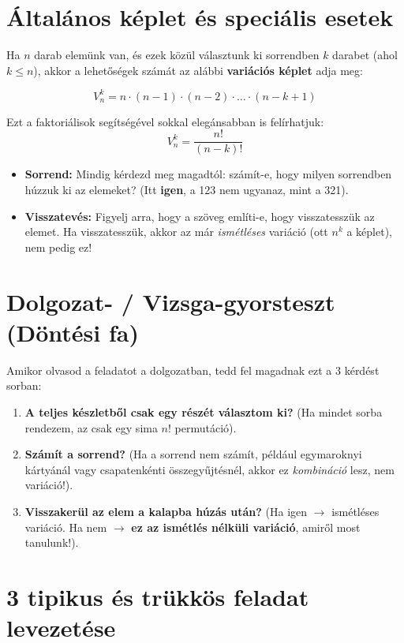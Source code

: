 \documentclass[11pt,a4paper]{article}
\begin{document}
\section{Általános képlet és speciális esetek}
Ha $n$ darab elemünk van, és ezek közül választunk ki sorrendben $k$ darabet (ahol $k \le n$), akkor a lehetőségek számát az alábbi \textbf{variációs képlet} adja meg:

\[ V_n^k = n \cdot (n-1) \cdot (n-2) \cdot \dots \cdot (n - k + 1) \]

Ezt a faktoriálisok segítségével sokkal elegánsabban is felírhatjuk:
\[ V_n^k = \frac{n!}{(n-k)!} \]

\begin{tcolorbox}[colback=myboxbg,colframe=myaccent,title=\textbf{Vigyázz a csapdákra!}]
\begin{itemize}
    \item \textbf{Sorrend:} Mindig kérdezd meg magadtól: számít-e, hogy milyen sorrendben húzzuk ki az elemeket? (Itt \textbf{igen}, a 123 nem ugyanaz, mint a 321).
    \item \textbf{Visszatevés:} Figyelj arra, hogy a szöveg említi-e, hogy visszatesszük az elemet. Ha visszatesszük, akkor az már \emph{ismétléses} variáció (ott $n^k$ a képlet), nem pedig ez!
\end{itemize}
\end{tcolorbox}

\section{Dolgozat- / Vizsga-gyorsteszt (Döntési fa)}
Amikor olvasod a feladatot a dolgozatban, tedd fel magadnak ezt a 3 kérdést sorban:
\begin{enumerate}
    \item \textbf{A teljes készletből csak egy részét választom ki?} (Ha mindet sorba rendezem, az csak egy sima $n!$ permutáció).
    \item \textbf{Számít a sorrend?} (Ha a sorrend nem számít, például egymaroknyi kártyánál vagy csapatenkénti összegyűjtésnél, akkor ez \emph{kombináció} lesz, nem variáció!).
    \item \textbf{Visszakerül az elem a kalapba húzás után?} (Ha igen $\rightarrow$ ismétléses variáció. Ha nem $\rightarrow$ \textbf{ez az ismétlés nélküli variáció}, amiről most tanulunk!).
\end{enumerate}

\section{3 tipikus és trükkös feladat levezetése}
\end{document}
